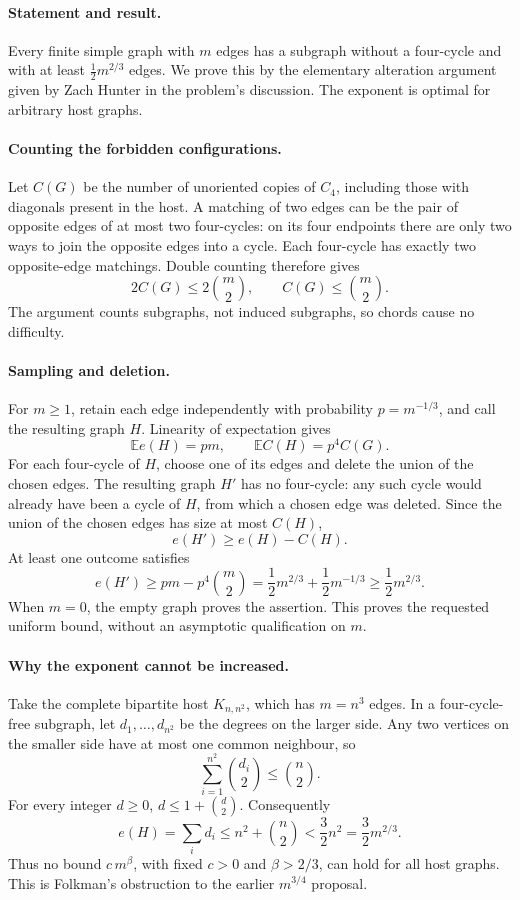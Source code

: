 \paragraph{Statement and result.}
Every finite simple graph with \(m\) edges has a subgraph without a four-cycle and with at least \(\tfrac12m^{2/3}\) edges. We prove this by the elementary alteration argument given by Zach Hunter in the problem's discussion. The exponent is optimal for arbitrary host graphs.

\paragraph{Counting the forbidden configurations.}
Let \(C(G)\) be the number of unoriented copies of \(C_4\), including those with diagonals present in the host. A matching of two edges can be the pair of opposite edges of at most two four-cycles: on its four endpoints there are only two ways to join the opposite edges into a cycle. Each four-cycle has exactly two opposite-edge matchings. Double counting therefore gives
\[
 2C(G)\leq 2\binom m2,\qquad C(G)\leq\binom m2.
\tag{1}
\]
The argument counts subgraphs, not induced subgraphs, so chords cause no difficulty.

\paragraph{Sampling and deletion.}
For \(m\geq1\), retain each edge independently with probability \(p=m^{-1/3}\), and call the resulting graph \(H\). Linearity of expectation gives
\[
 \mathbb E e(H)=pm,\qquad
 \mathbb E C(H)=p^4C(G).
\]
For each four-cycle of \(H\), choose one of its edges and delete the union of the chosen edges. The resulting graph \(H'\) has no four-cycle: any such cycle would already have been a cycle of \(H\), from which a chosen edge was deleted. Since the union of the chosen edges has size at most \(C(H)\),
\[
 e(H')\geq e(H)-C(H).
\]
At least one outcome satisfies
\[
 e(H')\geq pm-p^4\binom m2
 =\frac12m^{2/3}+\frac12m^{-1/3}
 \geq\frac12m^{2/3}.
\]
When \(m=0\), the empty graph proves the assertion. This proves the requested uniform bound, without an asymptotic qualification on \(m\).

\paragraph{Why the exponent cannot be increased.}
Take the complete bipartite host \(K_{n,n^2}\), which has \(m=n^3\) edges. In a four-cycle-free subgraph, let \(d_1,\ldots,d_{n^2}\) be the degrees on the larger side. Any two vertices on the smaller side have at most one common neighbour, so
\[
 \sum_{i=1}^{n^2}\binom{d_i}{2}\leq\binom n2.
\]
For every integer \(d\geq0\), \(d\leq1+\binom d2\). Consequently
\[
 e(H)=\sum_i d_i\leq n^2+\binom n2<\frac32n^2
 =\frac32m^{2/3}.
\]
Thus no bound \(c\,m^\beta\), with fixed \(c>0\) and \(\beta>2/3\), can hold for all host graphs. This is Folkman's obstruction to the earlier \(m^{3/4}\) proposal.

